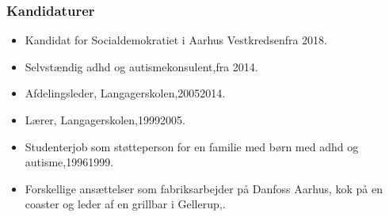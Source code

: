 \documentclass[11pt, a4paper]{awesome-cv}
\begin{document}
\begin{cvletter}
\subsubsection*{Kandidaturer}
\begin{itemize}
\item Kandidat for Socialdemokratiet i Aarhus Vestkredsenfra 2018.
\end{itemize}
\begin{itemize}
\item Selvstændig adhd og autismekonsulent,fra 2014.
\item Afdelingsleder, Langagerskolen,20052014.
\item Lærer, Langagerskolen,19992005.
\item Studenterjob som støtteperson for en familie med børn med adhd og autisme,19961999.
\item Forskellige ansættelser som fabriksarbejder på Danfoss Aarhus, kok på en coaster og leder af en grillbar i Gellerup,.
\end{itemize}
\end{cvletter}
\end{document}
